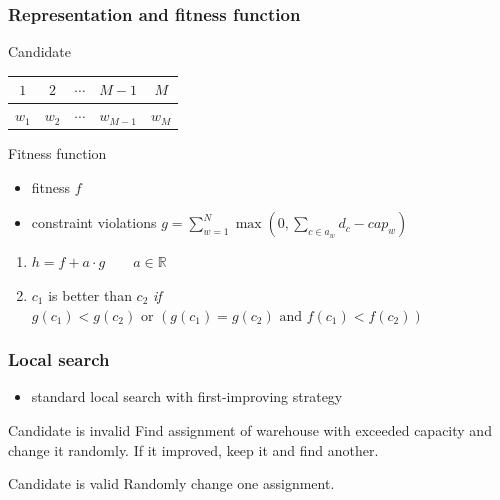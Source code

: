 \documentclass{beamer}
\begin{document}
\begin{frame}
    \frametitle{Representation and fitness function}
    \begin{block}{Candidate}
        \begin{center}
            \begin{tabular}{| c | c | c | c | c |}
                \multicolumn{1}{c}{$1$} & \multicolumn{1}{c}{$2$} & \multicolumn{1}{c}{$\cdots$} & \multicolumn{1}{c}{$M - 1$} & \multicolumn{1}{c}{$M$} \\
                \hline
                $w_1$ & $w_2$ & $\cdots$ & $w_{M-1}$ & $w_M$ \\
                \hline
            \end{tabular}
        \end{center}
    \end{block}
    \begin{block}{Fitness function}
        \begin{itemize}
            \item fitness $f$
            \item constraint violations $g = \displaystyle\sum_{w = 1}^{N}\max(0, \sum_{c \in a_w} d_c - cap_w)$
        \end{itemize}
        \begin{enumerate}
            \item $h = f + a \cdot g \qquad a \in \mathbb{R}$
            \item $c_1$ is better than $c_2$ \textit{if} $g(c_1) < g(c_2) \text{ or } (g(c_1) = g(c_2) \text{ and } f(c_1) < f(c_2))$
        \end{enumerate}
    \end{block}
\end{frame}

\begin{frame}
    \frametitle{Local search}
    \begin{itemize}
        \item standard local search with first-improving strategy
    \end{itemize}
    \begin{block}{Candidate is invalid}
        Find assignment of warehouse with exceeded capacity and change it randomly. If it improved, keep it and find another.
    \end{block}
    \begin{block}{Candidate is valid}
        Randomly change one assignment.
    \end{block}
\end{frame}
\end{document}
